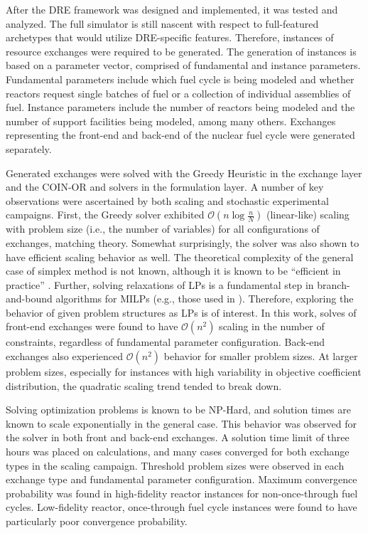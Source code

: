 After the DRE framework was designed and implemented, it was tested and
analyzed. The full \Cyclus simulator is still nascent with respect to
full-featured archetypes that would utilize DRE-specific features. Therefore,
instances of resource exchanges were required to be generated. The generation of
instances is based on a parameter vector, comprised of fundamental and instance
parameters. Fundamental parameters include which fuel cycle is being modeled and
whether reactors request single batches of fuel or a collection of individual
assemblies of fuel. Instance parameters include the number of reactors being
modeled and the number of support facilities being modeled, among many
others. Exchanges representing the front-end and back-end of the nuclear fuel
cycle were generated separately.

Generated exchanges were solved with the Greedy Heuristic in the exchange layer
and the COIN-OR \clp and \cbc solvers in the formulation layer. A number of key
observations were ascertained by both scaling and stochastic experimental
campaigns. First, the Greedy solver exhibited $\mathcal{O}(n\log{}\frac{n}{N})$
(linear-like) scaling with problem size (i.e., the number of variables) for all
configurations of exchanges, matching theory. Somewhat surprisingly, the \clp
solver was also shown to have efficient scaling behavior as well. The
theoretical complexity of the general case of simplex method is not known,
although it is known to be ``efficient in practice''
\cite{goldfarb1994complexity}. Further, solving relaxations of LPs is a
fundamental step in branch-and-bound algorithms for MILPs (e.g., those used in
\cbc). Therefore, exploring the behavior of given problem structures as LPs is
of interest. In this work, \clp solves of front-end exchanges were found to have
$\mathcal{O}(n^2)$ scaling in the number of constraints, regardless of
fundamental parameter configuration. Back-end exchanges also experienced
$\mathcal{O}(n^2)$ behavior for smaller problem sizes. At larger problem sizes,
especially for instances with high variability in objective coefficient
distribution, the quadratic scaling trend tended to break down.

Solving optimization problems is known to be NP-Hard, and solution times are
known to scale exponentially in the general case. This behavior was observed for
the \cbc solver in both front and back-end exchanges. A solution time limit of
three hours was placed on \cbc calculations, and many cases converged for both
exchange types in the scaling campaign. Threshold problem sizes were observed in
each exchange type and fundamental parameter configuration. Maximum convergence
probability was found in high-fidelity reactor instances for non-once-through
fuel cycles. Low-fidelity reactor, once-through fuel cycle instances were found
to have particularly poor convergence probability.

